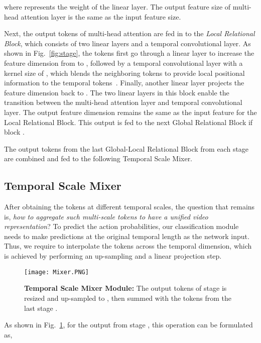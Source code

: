 \documentclass[10pt,twocolumn,letterpaper]{article}
\begin{document}
where  represents the weight of the linear layer. The output feature size of multi-head attention layer is the same as the input feature size.

Next, the output tokens of multi-head attention are fed in to the \textit{Local Relational Block}, which consists of two linear layers and a temporal convolutional layer. 
As shown in Fig.~\ref{fig:stage}, the tokens first go through a linear layer to increase the feature dimension from  to , followed by a temporal convolutional layer with a kernel size of , which blends the neighboring tokens to provide local positional information to the temporal tokens~\cite{islam2020much}. Finally, another linear layer projects the feature dimension back to .
The two linear layers in this block enable the transition between the multi-head attention layer and temporal convolutional layer. 
The output feature dimension remains the same as the input feature for the Local Relational Block. This output is fed to the next Global Relational Block if block .

\iffalse
The computation flow can be presented as:

where  is the output of the Global Relational Block,  is the temporal convolution, ,  and  is the ratio to project the feature into a higher space. The temporal resolution and feature size are not change across the Global-Local Relational Blocks in the same stage. 
\fi

The output tokens from the last Global-Local Relational Block from each stage are combined and fed to the following Temporal Scale Mixer. 


\subsection{Temporal Scale Mixer}

After obtaining the tokens at different temporal scales, the question that remains is, \textit{how to aggregate such multi-scale tokens to have a unified video representation}?
To predict the action probabilities, our classification module needs to make predictions at the original temporal length as the network input. Thus, we require to interpolate the tokens across the temporal dimension, which is achieved by performing an up-sampling and a linear projection step. 
\begin{figure}[t!]
\centering
\texttt{[image: Mixer.PNG]}
\caption{\textbf{Temporal Scale Mixer Module:} The output tokens  of stage  is resized and up-sampled to , then summed with the tokens from the last stage . 
}
\label{fig:mixer}
\end{figure}
As shown in Fig.~\ref{fig:mixer}, for the output  from stage , this operation can be formulated as,
\end{document}
